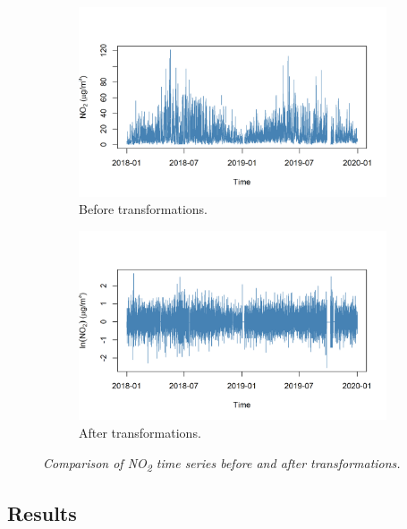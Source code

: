 \documentclass[a4paper, 10pt]{article}
\begin{document}
\begin{flushleft}
      \begin{figure}[H]
         \centering
         \begin{subfigure}{0.48\linewidth}
            \centering
            \includegraphics[width=\linewidth]{../img/extracted_no2.png}
            \caption{Before transformations.}
         \end{subfigure}
         \hfill
         \begin{subfigure}{0.48\linewidth}
            \centering
            \includegraphics[width=\linewidth]{../img/stationary_no2.png}
            \caption{After transformations.}
         \end{subfigure}
         \caption{\textit{Comparison of NO\textsubscript{2} time series before and after transformations.}}
      \end{figure}

      \subsection*{Results}


\end{flushleft}
\end{document}
